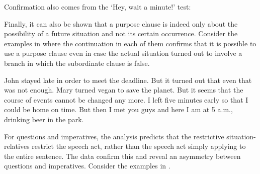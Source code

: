 \documentclass[output=paper,
colorlinks,
citecolor=brown,
newtxmath
]{langscibook}
\begin{document}
\largerpage[-1] %

Confirmation also comes from the `Hey, wait a minute!' test:

\ea\label{ex:PresupTest6}
\ea\label{ex:PresupTest6-a}
    \begin{exe}
    \end{exe}
\ex\label{ex:PresupTest6-b}
    \begin{exe}
    \end{exe}
\ex\label{ex:PresupTest6-c}
    \begin{exe}
    \end{exe}
\z\z


\noindent Finally, it can also be shown that a purpose clause is indeed only about the possibility of a future situation and not its certain occurrence. Consider the examples in  where the continuation in each of them confirms that it is possible to use a purpose clause even in case the actual situation turned out to involve a branch in which the subordinate clause is false.

\ea\label{ex:PossTest}
\ea John stayed late in order to meet the deadline. But it turned out that even that was not enough.
\ex Mary turned vegan to save the planet. But it seems that the course of events cannot be changed any more.
\ex I left five minutes early so that I could be home on time. But then I met you guys and here I am at 5 a.m., drinking beer in the park.
\z\z

\noindent For questions and imperatives, the analysis predicts that the restrictive situation-relatives restrict the speech act, rather than the speech act simply applying to the entire sentence. The data confirm this and reveal an asymmetry between questions and imperatives. Consider the examples in .

\ea\label{ex:SpAct}
\label{ex:SpAct-a}
\label{ex:SpAct-b}
\label{ex:SpAct-c}
\label{ex:SpAct-d}
\z\z
\end{document}
